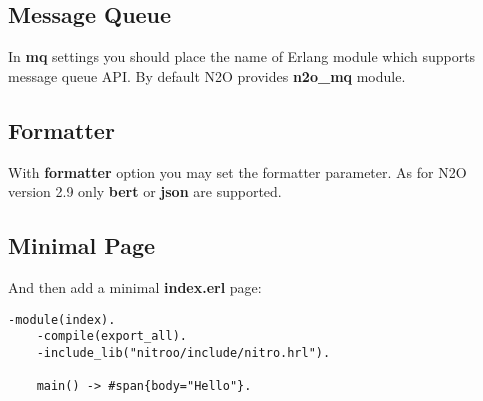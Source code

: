 \newpage
\subsection*{Message Queue}
In {\bf mq} settings you should place the name of Erlang module which supports
message queue API. By default N2O provides {\bf n2o\_mq} module.

\subsection*{Formatter}
With {\bf formatter} option you may set the formatter parameter.
As for N2O version 2.9 only {\bf bert} or {\bf json} are supported.

\subsection*{Minimal Page}
And then add a minimal {\bf index.erl} page:

\vspace{1\baselineskip}
\begin{lstlisting}[caption=index.erl]
    -module(index).
    -compile(export_all).
    -include_lib("nitroo/include/nitro.hrl").

    main() -> #span{body="Hello"}.
\end{lstlisting}
\vspace{1\baselineskip}
